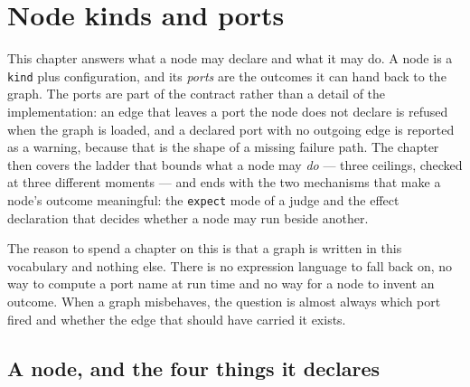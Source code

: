 \chapter{Node kinds and ports}

\label{ch:node-kinds}

This chapter answers what a node may declare and what it may do. A node is a \texttt{kind} plus
configuration, and its \emph{ports} are the outcomes it can hand back to the graph. The ports are
part of the contract rather than a detail of the implementation: an edge that leaves a port the node
does not declare is refused when the graph is loaded, and a declared port with no outgoing edge is
reported as a warning, because that is the shape of a missing failure path. The chapter then covers
the ladder that bounds what a node may \emph{do} --- three ceilings, checked at three different
moments --- and ends with the two mechanisms that make a node's outcome meaningful: the
\texttt{expect} mode of a judge and the effect declaration that decides whether a node may run
beside another.

The reason to spend a chapter on this is that a graph is written in this vocabulary and nothing
else. There is no expression language to fall back on, no way to compute a port name at run time and
no way for a node to invent an outcome. When a graph misbehaves, the question is almost always which
port fired and whether the edge that should have carried it exists.

\section{A node, and the four things it declares}

\begin{center}
\end{center}

